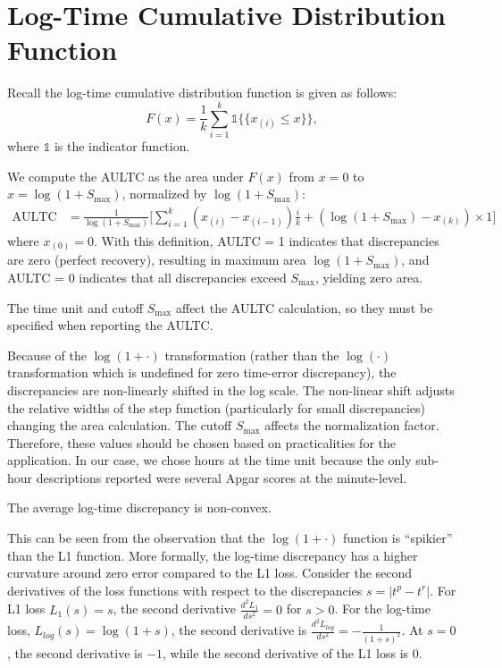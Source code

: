 \section{Log-Time Cumulative Distribution Function}
\label{apd:ltcdf}
Recall the log-time cumulative distribution function is given as follows:
\[
   F(x) = \frac{1}{k} \sum_{i=1}^k \mathds{1}\{\{x_{(i)} \leq x\}\},
\]
where $\mathds{1}$ is the indicator function.

We compute the AULTC as the area under $F(x)$ from $x = 0$ to $x = \log(1 + S_{\text{max}})$, normalized by $\log(1 + S_{\text{max}})$:
\begin{align*}
\text{AULTC} &= \frac{1}{\log(1 + S_{\text{max}})} \Bigg[ \sum_{i=1}^k (x_{(i)} - x_{(i-1)}) \frac{i}{k} + (\log(1 + S_{\text{max}}) - x_{(k)}) \times 1 \Bigg]
\end{align*}
where $x_{(0)} = 0$. With this definition, AULTC = 1 indicates that discrepancies are zero (perfect recovery), resulting in maximum area $\log(1 + S_{\text{max}})$, and AULTC = 0 indicates that all discrepancies exceed $S_{\text{max}}$, yielding zero area. 


\begin{remark}
The time unit and cutoff $S_\text{max}$ affect the AULTC calculation, so they must be specified when reporting the AULTC.
\end{remark}

Because of the $\log(1 + \cdot)$ transformation (rather than the $\log(\cdot)$ transformation which is undefined for zero time-error discrepancy), the discrepancies are non-linearly shifted in the log scale.  The non-linear shift adjusts the relative widths of the step function (particularly for small discrepancies) changing the area calculation.  The cutoff $S_\text{max}$ affects the normalization factor.  Therefore, these values should be chosen based on practicalities for the application.  In our case, we chose hours at the time unit because the only sub-hour descriptions reported were several Apgar scores at the minute-level.

\begin{remark}
    The average log-time discrepancy is non-convex.
\end{remark}
This can be seen from the observation that the $\log(1+\cdot)$ function is ``spikier'' than the L1 function. More formally, the log-time discrepancy has a higher curvature around zero error compared to the L1 loss. Consider the second derivatives of the loss functions with respect to the discrepancies $s = |t^p - t^r|$.  For L1 loss $L_1(s) = s$, the second derivative $\frac{d^2 L_1}{ds^2} = 0$ for $s > 0$.
For the log-time loss, $L_{log}(s) = \log(1 + s)$, the second derivative is $\frac{d^2 L_{log}}{ds^2} = -\frac{1}{(1 + s)^2}$. At $s = 0$, the second derivative is $-1$, while the second derivative of the L1 loss is $0$.

